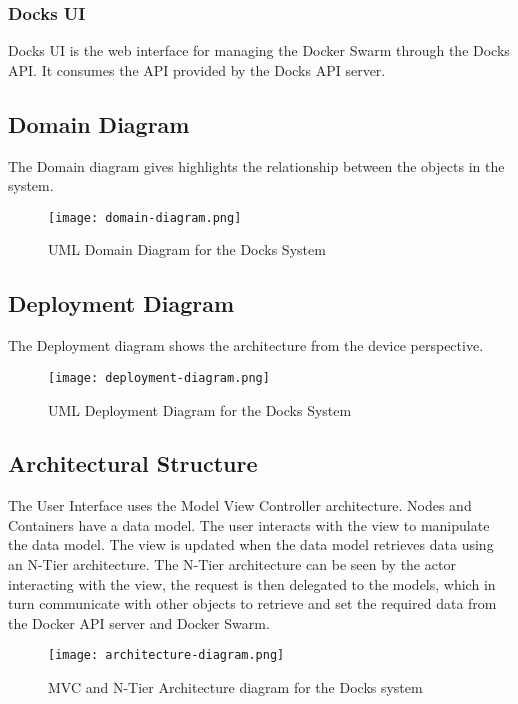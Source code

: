 \documentclass[]{article}
\begin{document}
\subsubsection{Docks UI}
Docks UI is the web interface for managing the Docker Swarm through the Docks API. It consumes the API provided by the Docks API server.

\subsection{Domain Diagram}
The Domain diagram gives highlights the relationship between the objects in the system.

\begin{figure}[h]
	\centering
	\texttt{[image: domain-diagram.png]}
	\caption{UML Domain Diagram for the Docks System}
\end{figure}

\subsection{Deployment Diagram}
The Deployment diagram shows the architecture from the device perspective.

\begin{figure}[h]
	\centering
	\texttt{[image: deployment-diagram.png]}
	\caption{UML Deployment Diagram for the Docks System}
\end{figure}

\pagebreak
\subsection{Architectural Structure}
The User Interface uses the Model View Controller architecture. Nodes and Containers have a data model. The user interacts with the view to manipulate the data model. The view is updated when the data model retrieves data using an N-Tier architecture. The N-Tier architecture can be seen by the actor interacting with the view, the request is then delegated to the models, which in turn communicate with other objects to retrieve and set the required data from the Docker API server and Docker Swarm.

\begin{figure}[h]
	\centering
	\texttt{[image: architecture-diagram.png]}
	\caption{MVC and N-Tier Architecture diagram for the Docks system}
\end{figure}
\end{document}
